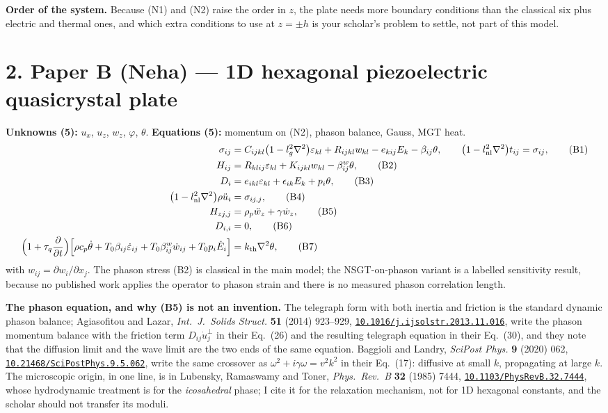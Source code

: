 \documentclass[11pt]{article}
\newcommand{\doi}[1]{\href{https://doi.org/#1}{\texttt{#1}}}
\begin{document}
\noindent\textbf{Order of the system.} Because (N1) and (N2) raise the order in $z$, the plate needs more
boundary conditions than the classical six plus electric and thermal ones, and which extra conditions to
use at $z=\pm h$ is your scholar's problem to settle, not part of this model.

\section*{2. Paper B (Neha) --- 1D hexagonal piezoelectric quasicrystal plate}

\noindent\textbf{Unknowns (5):} $u_x$, $u_z$, $w_z$, $\varphi$, $\theta$. \quad
\textbf{Equations (5):} momentum on (N2), phason balance, Gauss, MGT heat.
\begin{align}
\sigma_{ij}&=C_{ijkl}\bigl(1-l_g^2\nabla^2\bigr)\varepsilon_{kl}+R_{ijkl}w_{kl}-e_{kij}E_k-\beta_{ij}\theta,
\qquad \bigl(1-l_{\rm nl}^2\nabla^2\bigr)t_{ij}=\sigma_{ij}, \tag{B1}\\
H_{ij}&=R_{klij}\varepsilon_{kl}+K_{ijkl}w_{kl}-\beta^{w}_{ij}\theta, \tag{B2}\\
D_i&=e_{ikl}\varepsilon_{kl}+\epsilon_{ik}E_k+p_i\theta, \tag{B3}\\
\bigl(1-l_{\rm nl}^2\nabla^2\bigr)\rho\ddot u_i&=\sigma_{ij,j}, \tag{B4}\\
H_{zj,j}&=\rho_p\ddot w_z+\gamma\dot w_z, \tag{B5}\\
D_{i,i}&=0, \tag{B6}\\
\Bigl(1+\tau_q\frac{\partial}{\partial t}\Bigr)
\Bigl[\rho c_p\dot\theta+T_0\beta_{ij}\dot\varepsilon_{ij}
+T_0\beta^{w}_{ij}\dot w_{ij}+T_0p_i\dot E_i\Bigr]&=k_{\rm th}\nabla^2\theta, \tag{B7}
\end{align}
with $w_{ij}=\partial w_i/\partial x_j$. The phason stress (B2) is classical in the main model; the
NSGT-on-phason variant is a labelled sensitivity result, because no published work applies the operator
to phason strain and there is no measured phason correlation length.

\noindent\textbf{The phason equation, and why (B5) is not an invention.} The telegraph form with both
inertia and friction is the standard dynamic phason balance; Agiasofitou and Lazar, \emph{Int.\ J.\
Solids Struct.} \textbf{51} (2014) 923--929, \doi{10.1016/j.ijsolstr.2013.11.016}, write the phason
momentum balance with the friction term $D_{ij}\dot u^{\perp}_j$ in their Eq.~(26) and the resulting
telegraph equation in their Eq.~(30), and they note that the diffusion limit and the wave limit are the
two ends of the same equation. Baggioli and Landry, \emph{SciPost Phys.} \textbf{9} (2020) 062,
\doi{10.21468/SciPostPhys.9.5.062}, write the same crossover as $\omega^2+i\gamma\omega=v^2k^2$ in their
Eq.~(17): diffusive at small $k$, propagating at large $k$. The microscopic origin, in one line, is in
Lubensky, Ramaswamy and Toner, \emph{Phys.\ Rev.\ B} \textbf{32} (1985) 7444,
\doi{10.1103/PhysRevB.32.7444}, whose hydrodynamic treatment is for the \emph{icosahedral} phase; I cite
it for the relaxation mechanism, not for 1D hexagonal constants, and the scholar should not transfer its
moduli.
\end{document}
